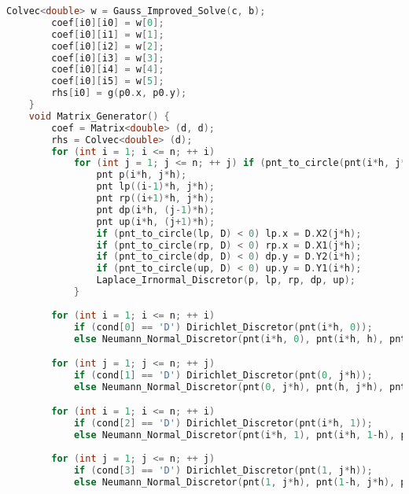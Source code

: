 \documentclass{ctexart}
\begin{document}
\begin{lstlisting}[language={c++}]
		Colvec<double> w = Gauss_Improved_Solve(c, b);
		coef[i0][i0] = w[0];
		coef[i0][i1] = w[1];
		coef[i0][i2] = w[2];
		coef[i0][i3] = w[3];
		coef[i0][i4] = w[4];
		coef[i0][i5] = w[5];
		rhs[i0] = g(p0.x, p0.y);
	}
	void Matrix_Generator() {
		coef = Matrix<double> (d, d);
		rhs = Colvec<double> (d);
		for (int i = 1; i <= n; ++ i)
			for (int j = 1; j <= n; ++ j) if (pnt_to_circle(pnt(i*h, j*h), D) > 0){
				pnt p(i*h, j*h);
				pnt lp((i-1)*h, j*h);
				pnt rp((i+1)*h, j*h);
				pnt dp(i*h, (j-1)*h);
				pnt up(i*h, (j+1)*h);
				if (pnt_to_circle(lp, D) < 0) lp.x = D.X2(j*h);
				if (pnt_to_circle(rp, D) < 0) rp.x = D.X1(j*h);
				if (pnt_to_circle(dp, D) < 0) dp.y = D.Y2(i*h);
				if (pnt_to_circle(up, D) < 0) up.y = D.Y1(i*h);
				Laplace_Irnormal_Discretor(p, lp, rp, dp, up);
			}
		
		for (int i = 1; i <= n; ++ i)
			if (cond[0] == 'D') Dirichlet_Discretor(pnt(i*h, 0));
			else Neumann_Normal_Discretor(pnt(i*h, 0), pnt(i*h, h), pnt(i*h, 2*h));

		for (int j = 1; j <= n; ++ j)
			if (cond[1] == 'D') Dirichlet_Discretor(pnt(0, j*h));
			else Neumann_Normal_Discretor(pnt(0, j*h), pnt(h, j*h), pnt(2*h, j*h));

		for (int i = 1; i <= n; ++ i)
			if (cond[2] == 'D') Dirichlet_Discretor(pnt(i*h, 1));
			else Neumann_Normal_Discretor(pnt(i*h, 1), pnt(i*h, 1-h), pnt(i*h, 1-2*h));
			
		for (int j = 1; j <= n; ++ j)
			if (cond[3] == 'D') Dirichlet_Discretor(pnt(1, j*h));
			else Neumann_Normal_Discretor(pnt(1, j*h), pnt(1-h, j*h), pnt(1-2*h, j*h));
		

\end{lstlisting}
\end{document}
